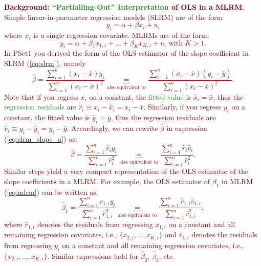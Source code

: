 \noindent \textcolor{Maroon}{\textbf{Background: \textcolor{ForestGreen}{``Partialling-Out'' Interpretation} of OLS in a MLRM}. Simple linear-in-parameter regression models (SLRM) are of the form 
\begin{equation}\label{eq:slrm}
y_i=\alpha+\beta x_i + u_i 
\end{equation}
where $x_i$ is a single regression covariate. MLRMs are of the form:
\begin{equation}\label{eq:mlrm}
y_i=\alpha+\beta_1 x_{1,i} + \dots + \beta_K x_{K,i} +u_i \text{ with } K>1.
\end{equation}
\noindent In PSet1 you derived the form of the OLS estimator of the slope coefficient in SLRM (\ref{eq:slrm}), namely 
\begin{equation}\label{eq:slrm_slope_a}
\hat{\beta}=\frac{\sum_{i=1}^{n}(x_i-\bar{x})y_i}{\sum_{i=1}^{n}(x_i-\bar{x})^2} \underbrace{=}_{\text{also equivalent to}} \frac{\sum_{i=1}^{n}(x_i-\bar{x})(y_i-\bar{y})}{\sum_{i=1}^{n}(x_i-\bar{x})^2}.
\end{equation}
Note that if you regress $x_i$ on a constant, the \textcolor{ForestGreen}{fitted value} is $\hat{x}_i=\bar{x}$, thus the \textcolor{ForestGreen}{regression residuals} are $\hat{r}_i \equiv x_i-\hat{x}_i=x_i-\bar{x}$. Similarly, if you regress $y_i$ on a constant, the fitted value is $\hat{y}_i=\bar{y}$, thus the regression residuals are $\hat{v}_i \equiv y_i-\hat{y}_i=y_i-\bar{y}$. Accordingly, we can rewrite $\hat{\beta}$ in expression (\ref{eq:slrm_slope_a}) as:
\begin{equation}\label{eq:slrm_slope_b}
\hat{\beta}=\frac{\sum_{i=1}^{n}\hat{r}_i y_i}{\sum_{i=1}^{n}\hat{r}_i^2} \underbrace{=}_{\text{also equivalent to}} \frac{\sum_{i=1}^{n}\hat{r}_i \hat{v}_i}{\sum_{i=1}^{n}\hat{r}_i^2}.
\end{equation}
Similar steps yield a very compact representation of the OLS estimator of the slope coefficient\textbf{s} in a MLRM. For example, the OLS estimator of $\beta_1$ in MLRM (\ref{eq:mlrm}) can be written as: 
\begin{equation}\label{eq:mlrm_slope_b}
\hat{\beta}_1=\frac{\sum_{i=1}^{n}\hat{r}_{1,i}y_i}{\sum_{i=1}^{n}\hat{r}_{1,i}^2} \underbrace{=}_{\text{also equivalent to}} \frac{\sum_{i=1}^{n}\hat{r}_{1,i}\hat{v}_{1,i}}{\sum_{i=1}^{n}\hat{r}_{1,i}^2},
\end{equation}
where $\hat{r}_{1,i}$ denotes the residuals from regressing $x_{1,i}$ on a constant and all remaining regression covariates, i.e., $\{x_{2,i},\ldots,x_{K,i} \}$ and $\hat{v}_{1,i}$ denotes the residuals from regressing $y_{i}$ on a constant and all remaining regression covariates, i.e., $\{x_{2,i},\ldots,x_{K,i} \}$. Similar expressions hold for $\hat{\beta}_2$, $\hat{\beta}_3$, etc.}

\setlength{\abovedisplayskip}{0pt}
\setlength{\belowdisplayskip}{-10pt}
\setlength{\abovedisplayshortskip}{0pt}
\setlength{\belowdisplayshortskip}{0pt}
